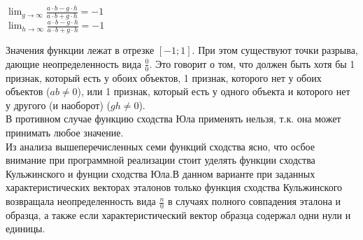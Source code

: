 \documentclass[a4paper,12pt]{article}
\begin{document}
\begin{flushleft}
\begin{enumerate}
\begin{center}
						\medskip						
						${\lim_{g\to \infty} \frac{a\cdot b-g\cdot h}{a\cdot b+g\cdot h}=-1}$
						\\
						\medskip						
						${\lim_{h\to \infty} \frac{a\cdot b-g\cdot h}{a\cdot b+g\cdot h}=-1}$					
					\end{center}
Значения функции лежат в отрезке ${[-1;1]}$. При этом существуют точки разрыва, дающие неопределенность вида ${\frac{0}{0}}$. Это говорит о том, что должен быть хотя бы 1 признак, который есть у обоих объектов, 1 признак, которого нет у обоих объектов (${ab \ne 0}$), или 1 признак, который есть у одного объекта и которого нет у другого (и наоборот) (${gh \ne 0}$).
\\
\medskip
В противном случае функцию сходства Юла применять нельзя, т.к. она может принимать любое значение.\\
\bigskip
Из анализа вышеперечисленных семи функций сходства ясно, что осбое внимание при программной реализации стоит уделять функции сходства Кульжинского и фунции сходства Юла.В данном варианте при заданных характеристических векторах эталонов только функция сходства Кульжинского возвращала неопределенность вида ${\frac{n}{0}}$ в случаях полного совпадения эталона и образца, а также если характеристический вектор образца содержал одни нули и единицы. 	
			\end{enumerate}				 
 	\end{flushleft}
\end{document}

